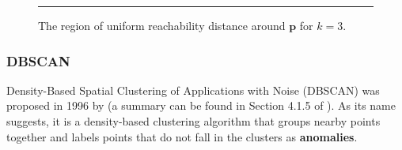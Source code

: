 \begin{figure}[H]
\hrule \vspace{0.4cm} \centering
{}
\caption{The region of uniform reachability distance around $\mathbf{p}$ for $k=3$.}
\label{reachability}
\end{figure}
\newpage\noindent  

\subsubsection*{DBSCAN}
Density-Based Spatial Clustering of Applications with Noise (DBSCAN) was proposed in 1996 by \cite{DBSCAN} (a summary can be found in Section 4.1.5 of \cite{A10}). As its name suggests, it is a density-based clustering algorithm that groups nearby points together and labels points that do not fall in the clusters as \textbf{anomalies}.

